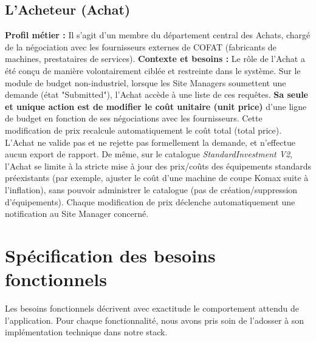 \subsection{L'Acheteur (Achat)}
\textbf{Profil métier :} Il s'agit d'un membre du département central des Achats, chargé de la négociation avec les fournisseurs externes de COFAT (fabricants de machines, prestataires de services).
\newline
\textbf{Contexte et besoins :} Le rôle de l'Achat a été conçu de manière volontairement ciblée et restreinte dans le système. Sur le module de budget non-industriel, lorsque les Site Managers soumettent une demande (état "Submitted"), l'Achat accède à une liste de ces requêtes. \textbf{Sa seule et unique action est de modifier le coût unitaire (unit price)} d'une ligne de budget en fonction de ses négociations avec les fournisseurs. Cette modification de prix recalcule automatiquement le coût total (total price). L'Achat ne valide pas et ne rejette pas formellement la demande, et n'effectue aucun export de rapport. De même, sur le catalogue \textit{StandardInvestment V2}, l'Achat se limite à la stricte mise à jour des prix/coûts des équipements standards préexistants (par exemple, ajuster le coût d'une machine de coupe Komax suite à l'inflation), sans pouvoir administrer le catalogue (pas de création/suppression d'équipements). Chaque modification de prix déclenche automatiquement une notification au Site Manager concerné.

\section{Spécification des besoins fonctionnels}
Les besoins fonctionnels décrivent avec exactitude le comportement attendu de l'application. Pour chaque fonctionnalité, nous avons pris soin de l'adosser à son implémentation technique dans notre stack.

